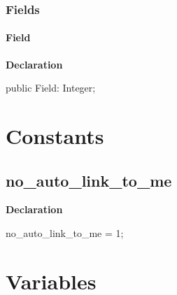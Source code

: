 \documentclass{report}
\begin{document}
\subsubsection*{\large{\textbf{Fields}}\normalsize\hspace{1ex}\hfill}
\paragraph*{Field}\hspace*{\fill}

\begin{list}{}{
\setlength{\itemindent}{0cm}
\setlength{\listparindent}{0cm}
\setlength{\leftmargin}{\evensidemargin}
\addtolength{\leftmargin}{\tmplength}
\settowidth{\labelsep}{X}
\addtolength{\leftmargin}{\labelsep}
\setlength{\labelwidth}{\tmplength}
}
\begin{flushleft}
\item[\textbf{Declaration}\hfill]
\begin{ttfamily}
public Field: Integer;\end{ttfamily}


\end{flushleft}
\end{list}
\section{Constants}
\subsection*{no{\_}auto{\_}link{\_}to{\_}me}
\begin{list}{}{
\setlength{\itemindent}{0cm}
\setlength{\listparindent}{0cm}
\setlength{\leftmargin}{\evensidemargin}
\addtolength{\leftmargin}{\tmplength}
\settowidth{\labelsep}{X}
\addtolength{\leftmargin}{\labelsep}
\setlength{\labelwidth}{\tmplength}
}
\begin{flushleft}
\item[\textbf{Declaration}\hfill]
\begin{ttfamily}
no{\_}auto{\_}link{\_}to{\_}me = 1;\end{ttfamily}


\end{flushleft}
\end{list}
\section{Variables}
\end{document}
